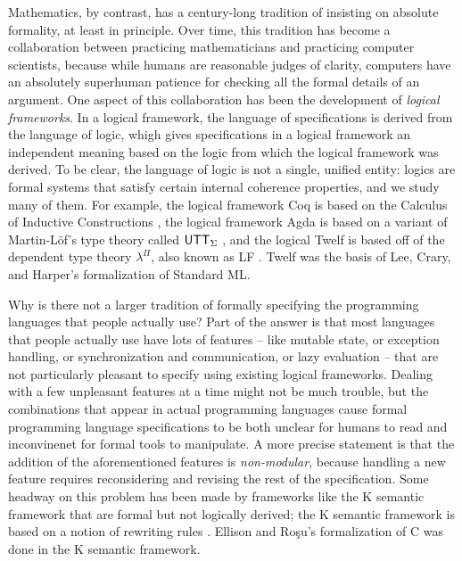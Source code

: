 Mathematics, by contrast, has a century-long tradition of insisting on
absolute formality, at least in principle. Over time, this tradition
has become a collaboration between practicing mathematicians and
practicing computer scientists, because while humans are reasonable
judges of clarity, computers have an absolutely superhuman patience
for checking all the formal details of an argument.  One aspect of
this collaboration has been the development of {\it logical
  frameworks}. In a logical framework, the language of specifications
is derived from the language of logic, whigh gives specifications in a
logical framework an independent meaning based on the logic from which
the logical framework was derived. To be clear, the language of logic
is not a single, unified entity: logics are formal systems that
satisfy certain internal coherence properties, and we study many of
them. For example, the logical framework Coq is based on the Calculus
of Inductive Constructions \cite{coq10coq}, the logical framework Agda
is based on a variant of Martin-L\"of's type theory called ${\sf
  UTT}_\Sigma$ \cite{norell08towards}, and the logical Twelf is based
off of the dependent type theory $\lambda^\Pi$, also known as LF
\cite{pfenning99system}. Twelf was the basis of Lee, Crary, and
Harper's formalization of Standard ML.  %

Why is there not a larger tradition of formally specifying the
programming languages that people actually use? Part of the answer is
that most languages that people actually use have lots of features --
like mutable state, or exception handling, or synchronization and
communication, or lazy evaluation -- that are not particularly
pleasant to specify using existing logical frameworks. Dealing with a
few unpleasant features at a time might not be much trouble, but the
combinations that appear in actual programming languages cause formal
programming language specifications to be both unclear for humans to
read and inconvinenet for formal tools to manipulate. A more precise
statement is that the addition of the aforementioned features is {\it
  non-modular}, because handling a new feature requires reconsidering
and revising the rest of the specification.  Some headway on this
problem has been made by frameworks like the K semantic framework that
are formal but not logically derived; the K semantic framework is
based on a notion of rewriting rules \cite{rosu10overview}. Ellison
and Ro\c{s}u's formalization of C was done in the K semantic
framework.

